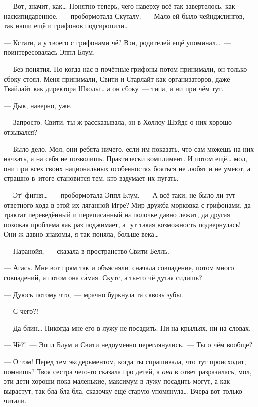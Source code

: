 \documentclass[fontsize=11pt,a5paper,titlepage=firstcover]{scrbook}
\begin{document}
--- Вот, значит, как{\ldots} Понятно теперь, чего наверху всё так завертелось, как наскипидаренное,~--- пробормотала Скуталу.~--- Мало ей было чейнджлингов, так наши ещё и грифонов подсиропили{\ldots}

--- Кстати, а у твоего с грифонами чё? Вон, родителей ещё упоминал{\ldots}~--- поинтересовалась Эппл Блум.

--- Без понятия. Но когда нас в почётные грифоны потом принимали, он только сбоку стоял. Меня принимали, Свити и Старлайт как организаторов, даже Твайлайт как директора Школы{\ldots} а он сбоку~--- типа, и ни при чём тут.

--- Дык, наверно, уже.

--- Запросто. Свити, ты ж рассказывала, он в Холлоу-Шэйдс о них хорошо отзывался?

--- Было дело. Мол, они ребята ничего, если им показать, что сам можешь на них начхать, а на себя не позволишь. Практически комплимент. И потом ещё{\ldots} мол, они при всех своих национальных особенностях бояться не любят и не умеют, а страшно в~итоге становится тем, кто вздумает их пугать.

--- Эт’ фигня{\ldots}~--- пробормотала Эппл Блум.~--- А всё-таки, не было ли тут ответного хода в этой их ляганной Игре? Мир-дружба-морковка с грифонами, да трактат переведённый и переписанный на полочке давно лежит, да другая похожая проблема как раз поджимает, а тут такая возможность подвернулась! Они ж давно знакомы, я так поняла, больше века{\ldots}

--- Паранойя,~--- сказала в пространство Свити Белль.

--- Агась. Мне вот прям так и объясняли: сначала совпадение, потом много совпадений, а потом она са́мая. Скутс, а ты-то чё дутая сидишь?

--- Дуюсь потому что,~--- мрачно буркнула та сквозь зубы.

--- С чего?!

--- Да блин{\ldots} Никогда мне его в лужу не посадить. Ни на крыльях, ни на словах.

--- Чё?!~--- Эппл Блум и Свити недоуменно переглянулись.~--- Ты о чём вообще?

--- О том! Перед тем эксдерьментом, когда ты спрашивала, что тут происходит, помнишь? Твоя сестра чего-то сказала про детей, а \emph{она} в ответ разразилась, мол, эти дети хороши пока маленькие, максимум в лужу посадить могут, а как вырастут, так бла-бла-бла, сказочку ещё старую упомянула{\ldots} Вчера вот только читали.
\end{document}
